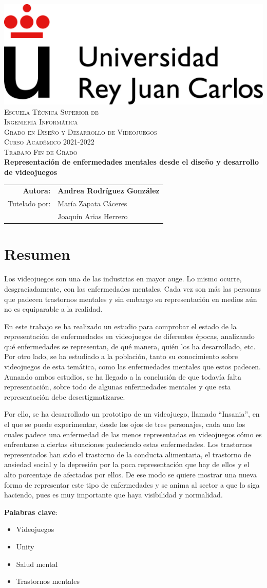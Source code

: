 \documentclass[12pt, a4paper,twoside,titlepage]{book}
\newcommand{\grado}{Grado en Diseño y Desarrollo de Videojuegos}
\newcommand{\titulotrabajo}{Representación de enfermedades mentales desde el diseño y desarrollo de videojuegos}
\newcommand{\curso}{Curso Académico 2021-2022}
\newcommand{\autor}{Andrea Rodríguez González}
\newcommand{\tutor}{María Zapata Cáceres}
\newcommand{\cotutor}{Joaquín Arias Herrero}
\renewcommand*{\maketitle}{%
\begin{titlepage}
  \pagestyle{plain}

  \begin{center}
    \vspace*{-4em}
    \includegraphics[scale=.9]{URJ_logo_Color_POS}\\
    \vspace*{4em}
    \textsc{\Large Escuela Técnica Superior de\\Ingeniería Informática}\\
    \vspace*{2em}
    \textsc{\Large \grado}\\  %
    \vspace*{3em}
     \textsc{\large \curso\\}  %
    \vspace*{1.5em}
    \textsc{\large Trabajo Fin de Grado\\}
    \vspace*{13em}
    \textbf{\LARGE \titulotrabajo\\}  %
    \vspace*{5em}
    {%
      \large
      \begin{tabular}{rl}
        \textbf{Autora:} & \textbf{\autor}\\[.5em]
        {Tutelado por:} & {\tutor}\\[-.25em]
                          & {\cotutor}\\
      \end{tabular}
    }
  \end{center}
  
\end{titlepage}
}
\let\origdoublepage\cleardoublepage
\renewcommand{\cleardoublepage}{\clearpage{\pagestyle{empty}\origdoublepage}}
\begin{document}
\maketitle



\cleardoublepage
{}
\setcounter{page}{1}

\chapter*{Resumen}

Los videojuegos son una de las industrias en mayor auge. Lo mismo ocurre, desgraciadamente, con las enfermedades mentales. Cada vez son más las personas que padecen trastornos mentales y sin embargo su representación en medios aún no es equiparable a la realidad. 

En este trabajo se ha realizado un estudio para comprobar el estado de la representación de enfermedades en videojuegos de diferentes épocas, analizando qué enfermedades se representan, de qué manera, quién los ha desarrollado, etc. Por otro lado, se ha estudiado a la población, tanto su conocimiento sobre videojuegos de esta temática, como las enfermedades mentales que estos padecen. Aunando ambos estudios, se ha llegado a la conclusión de que todavía falta representación, sobre todo de algunas enfermedades mentales y que esta representación debe desestigmatizarse. 

Por ello, se ha desarrollado un prototipo de un videojuego, llamado ``Insania'', en el que se puede experimentar, desde los ojos de tres personajes, cada uno los cuales padece una enfermedad de las menos representadas en videojuegos cómo es enfrentarse a ciertas situaciones padeciendo estas enfermedades. Los trastornos representados han sido el trastorno de la conducta alimentaria, el trastorno de ansiedad social y la depresión por la poca representación que hay de ellos y el alto porcentaje de afectados por ellos. De ese modo se quiere mostrar una nueva forma de representar este tipo de enfermedades y se anima al sector a que lo siga haciendo, pues es muy importante que haya visibilidad y normalidad. 


\noindent \textbf{Palabras clave}:
\begin{itemize}
   \item Videojuegos
   \item Unity
   \item Salud mental
   \item Trastornos mentales
\end{itemize}
\end{document}

